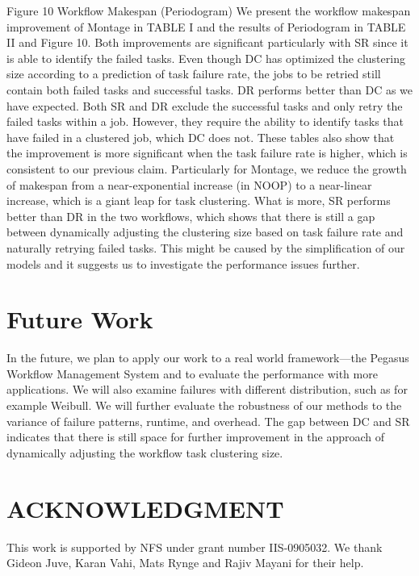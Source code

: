 \documentclass{IOS-Book-Article}
\begin{document}
 
Figure 10	Workflow Makespan (Periodogram)
We present the workflow makespan improvement of Montage in TABLE I and the results of Periodogram in TABLE II and Figure 10. Both improvements are significant particularly with SR since it is able to identify the failed tasks. Even though DC has optimized the clustering size according to a prediction of task failure rate, the jobs to be retried still contain both failed tasks and successful tasks. DR performs better than DC as we have expected. Both SR and DR exclude the successful tasks and only retry the failed tasks within a job. However, they require the ability to identify tasks that have failed in a clustered job, which DC does not. These tables also show that the improvement is more significant when the task failure rate is higher, which is consistent to our previous claim. Particularly for Montage, we reduce the growth of makespan from a near-exponential increase (in NOOP) to a near-linear increase, which is a giant leap for task clustering. What is more, SR performs better than DR in the two workflows, which shows that there is still a gap between dynamically adjusting the clustering size based on task failure rate and naturally retrying failed tasks. This might be caused by the simplification of our models and it suggests us to investigate the performance issues further.


\section{Future Work}

In the future, we plan to apply our work to a real world framework---the Pegasus Workflow Management System and to evaluate the performance with more applications. We will also examine failures with different distribution, such as for example Weibull.  We will further evaluate the robustness of our methods to the variance of failure patterns, runtime, and overhead. The gap between DC and SR indicates that there is still space for further improvement in the approach of dynamically adjusting the workflow task clustering size. 

\section{ACKNOWLEDGMENT}
This work is supported by NFS under grant number IIS-0905032. We thank Gideon Juve, Karan Vahi, Mats Rynge and Rajiv Mayani for their help. 




\end{document}
